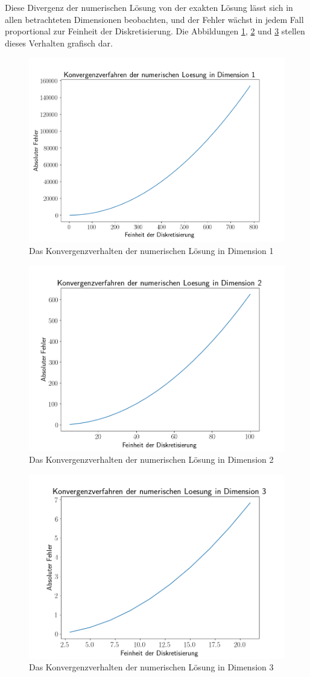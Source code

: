 \documentclass[smallheadings]{scrartcl}
\numberwithin{equation}{section}
\begin{document}
Diese Divergenz der numerischen Lösung von der exakten Lösung lässt sich in allen betrachteten Dimensionen beobachten, und der Fehler wächst in jedem Fall proportional zur Feinheit der Diskretisierung. Die Abbildungen \ref{fig:konvdim1}, \ref{fig:konvdim2} und \ref{fig:konvdim3} stellen dieses Verhalten grafisch dar.

\begin{figure}
	\centering
	\includegraphics[width=0.7\linewidth]{Bericht/Bilder/konvdim1}
	\caption{Das Konvergenzverhalten der numerischen Lösung in Dimension 1}
	\label{fig:konvdim1}
\end{figure}

\begin{figure}
	\centering
	\includegraphics[width=0.7\linewidth]{Bericht/Bilder/konvdim2}
	\caption{Das Konvergenzverhalten der numerischen Lösung in Dimension 2}
	\label{fig:konvdim2}
\end{figure}

\begin{figure}
	\centering
	\includegraphics[width=0.7\linewidth]{Bericht/Bilder/konvdim3}
	\caption{Das Konvergenzverhalten der numerischen Lösung in Dimension 3}
	\label{fig:konvdim3}
\end{figure}
\end{document}
